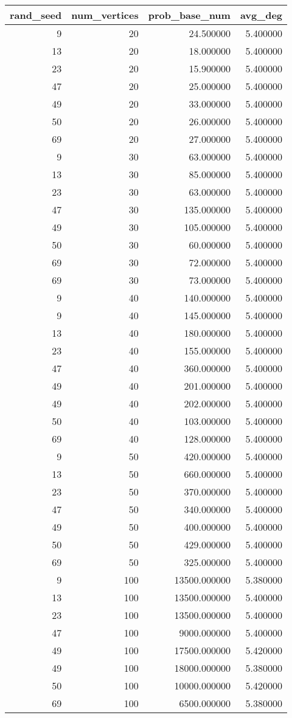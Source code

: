 \begin{tabular}{rrrr}
\toprule
rand_seed & num_vertices & prob_base_num & avg_deg \\
\midrule
9 & 20 & 24.500000 & 5.400000 \\
13 & 20 & 18.000000 & 5.400000 \\
23 & 20 & 15.900000 & 5.400000 \\
47 & 20 & 25.000000 & 5.400000 \\
49 & 20 & 33.000000 & 5.400000 \\
50 & 20 & 26.000000 & 5.400000 \\
69 & 20 & 27.000000 & 5.400000 \\
9 & 30 & 63.000000 & 5.400000 \\
13 & 30 & 85.000000 & 5.400000 \\
23 & 30 & 63.000000 & 5.400000 \\
47 & 30 & 135.000000 & 5.400000 \\
49 & 30 & 105.000000 & 5.400000 \\
50 & 30 & 60.000000 & 5.400000 \\
69 & 30 & 72.000000 & 5.400000 \\
69 & 30 & 73.000000 & 5.400000 \\
9 & 40 & 140.000000 & 5.400000 \\
9 & 40 & 145.000000 & 5.400000 \\
13 & 40 & 180.000000 & 5.400000 \\
23 & 40 & 155.000000 & 5.400000 \\
47 & 40 & 360.000000 & 5.400000 \\
49 & 40 & 201.000000 & 5.400000 \\
49 & 40 & 202.000000 & 5.400000 \\
50 & 40 & 103.000000 & 5.400000 \\
69 & 40 & 128.000000 & 5.400000 \\
9 & 50 & 420.000000 & 5.400000 \\
13 & 50 & 660.000000 & 5.400000 \\
23 & 50 & 370.000000 & 5.400000 \\
47 & 50 & 340.000000 & 5.400000 \\
49 & 50 & 400.000000 & 5.400000 \\
50 & 50 & 429.000000 & 5.400000 \\
69 & 50 & 325.000000 & 5.400000 \\
9 & 100 & 13500.000000 & 5.380000 \\
13 & 100 & 13500.000000 & 5.400000 \\
23 & 100 & 13500.000000 & 5.400000 \\
47 & 100 & 9000.000000 & 5.400000 \\
49 & 100 & 17500.000000 & 5.420000 \\
49 & 100 & 18000.000000 & 5.380000 \\
50 & 100 & 10000.000000 & 5.420000 \\
69 & 100 & 6500.000000 & 5.380000 \\
\bottomrule
\end{tabular}
